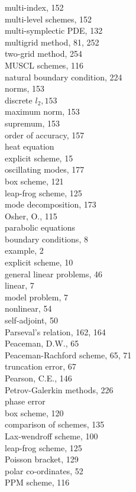 \documentclass[10pt]{article}
\begin{document}
multi-index, 152\\
multi-level schemes, 152\\
multi-symplectic PDE, 132\\
multigrid method, 81, 252\\
two-grid method, 254\\
MUSCL schemes, 116\\
natural boundary condition, 224\\
norms, 153\\
discrete \(l_{2}, 153\)\\
maximum norm, 153\\
supremum, 153\\
order of accuracy, 157\\
heat equation\\
explicit scheme, 15\\
oscillating modes, 177\\
box scheme, 121\\
leap-frog scheme, 125\\
mode decomposition, 173\\
Osher, O., 115\\
parabolic equations\\
boundary conditions, 8\\
example, 2\\
explicit scheme, 10\\
general linear problems, 46\\
linear, 7\\
model problem, 7\\
nonlinear, 54\\
self-adjoint, 50\\
Parseval's relation, 162, 164\\
Peaceman, D.W., 65\\
Peaceman-Rachford scheme, 65, 71\\
truncation error, 67\\
Pearson, C.E., 146\\
Petrov-Galerkin methods, 226\\
phase error\\
box scheme, 120\\
comparison of schemes, 135\\
Lax-wendroff scheme, 100\\
leap-frog scheme, 125\\
Poisson bracket, 129\\
polar co-ordinates, 52\\
PPM scheme, 116\\
\end{document}
